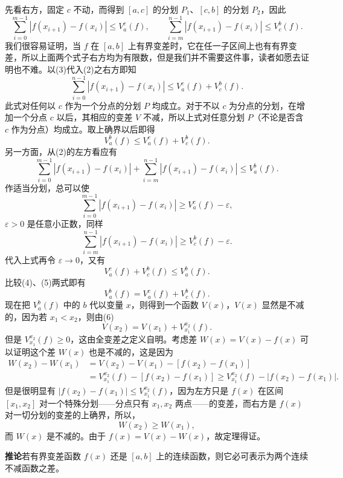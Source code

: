 先看右方，固定 $c$ 不动，而得到 $[a,c]$ 的分划 $P_1$、$[c,b]$ 的分划 $P_2$，因此
\begin{equation}
 \sum_{i=0}^{m-1}|f(x_{i+1})-f(x_i)|\le V_a^c(f),\qquad
 \sum_{i=m}^{n-1}|f(x_{i+1})-f(x_i)|\le V_c^b(f).
 \tag{3}
\end{equation}
我们很容易证明，当 $f$ 在 $[a,b]$ 上有界变差时，它在任一子区间上也有有界变差，所以上面两个式子右方均为有限数，但是我们并不需要这件事，读者如愿去证明也不难。以(3)代入(2)之右方即知
\[
 \sum_{i=0}^{n-1}|f(x_{i+1})-f(x_i)|\le V_a^c(f)+V_c^b(f).
\]
此式对任何以 $c$ 作为一个分点的分划 $P$ 均成立。对于不以 $c$ 为分点的分划，在增加一个分点 $c$ 以后，其相应的变差 $V$ 不减，所以上式对任意分划 $P$（不论是否含 $c$ 作为分点）均成立。取上确界以后即得
\begin{equation}
 V_a^b(f)\le V_a^c(f)+V_c^b(f).
 \tag{4}
\end{equation}
另一方面，从(2)的左方看应有
\[
 \sum_{i=0}^{m-1}|f(x_{i+1})-f(x_i)|
 +\sum_{i=m}^{n-1}|f(x_{i+1})-f(x_i)|\le V_a^b(f).
\]
作适当分划，总可以使
\[
 \sum_{i=0}^{m-1}|f(x_{i+1})-f(x_i)|\ge V_a^c(f)-\varepsilon,
\]
$\varepsilon>0$ 是任意小正数，同样
\[
 \sum_{i=m}^{n-1}|f(x_{i+1})-f(x_i)|\ge V_c^b(f)-\varepsilon.
\]
代入上式再令 $\varepsilon\to0$，又有
\begin{equation}
 V_a^c(f)+V_c^b(f)\le V_a^b(f).
 \tag{5}
\end{equation}
比较(4)、(5)两式即有
\begin{equation}
 V_a^b(f)=V_a^c(f)+V_c^b(f).
 \tag{6}
\end{equation}
现在把 $V_a^b(f)$ 中的 $b$ 代以变量 $x$，则得到一个函数 $V(x)$，$V(x)$ 显然是不减的，因为若 $x_1<x_2$，则由(6)
\[
 V(x_2)=V(x_1)+V_{x_1}^{x_2}(f).
\]
但是 $V_{x_1}^{x_2}(f)\ge0$，这由全变差之定义自明。考虑差 $W(x)=V(x)-f(x)$ 可以证明这个差 $W(x)$ 也是不减的，这是因为
\[
\begin{aligned}
 W(x_2)-W(x_1)
 &=V(x_2)-V(x_1)-[f(x_2)-f(x_1)]\\
 &=V_{x_1}^{x_2}(f)-[f(x_2)-f(x_1)]
 \ge V_{x_1}^{x_2}(f)-|f(x_2)-f(x_1)|.
\end{aligned}
\]
但是很明显有 $|f(x_2)-f(x_1)|\le V_{x_1}^{x_2}(f)$，因为左方只是 $f(x)$ 在区间 $[x_1,x_2]$ 对一个特殊分划——分点只有 $x_1,x_2$ 两点——的变差，而右方是 $f(x)$ 对一切分划的变差的上确界，所以，
\[
 W(x_2)\ge W(x_1),
\]
而 $W(x)$ 是不减的。由于 $f(x)=V(x)-W(x)$，故定理得证。

\noindent\textbf{推论}\quad 若有界变差函数 $f(x)$ 还是 $[a,b]$ 上的连续函数，则它必可表示为两个连续不减函数之差。

